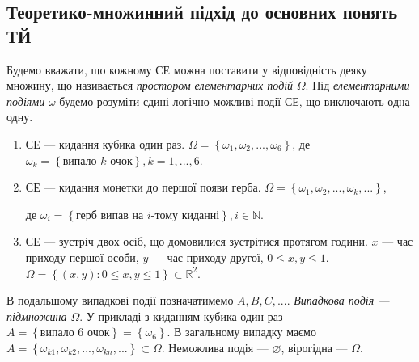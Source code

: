 \subsection{Теоретико-множинний підхід до основних понять ТЙ}
Будемо вважати, що кожному СЕ можна поставити у відповідність деяку множину, що
називається \emph{простором елементарних подій} $\Omega$. 
Під \emph{елементарними подіями} $\omega$ будемо розуміти єдині
логічно можливі події СЕ, що виключають одна одну.
\begin{example}
    \begin{enumerate}
        \mbox{}
        \item СЕ --- кидання кубика один раз. 
        $\Omega = \left\{\omega_1, \omega_2, ..., \omega_6\right\}$, 
        де $\omega_k = \left\{\text{випало } k \text{ очок}\right\}, k = 1,...,6$.
        \item СЕ --- кидання монетки до першої появи герба.
        $\Omega = \left\{\omega_1, \omega_2, ..., \omega_k, ...\right\}$, 
        
        де $\omega_i = \left\{\text{герб випав на }i\text{-тому киданні}\right\}, i\in \mathbb{N}$.
        \item СЕ --- зустріч двох осіб, що домовилися зустрітися протягом години.
        $x$ --- час приходу першої особи, $y$ --- час приходу другої, $0\leq x, y \leq 1$.
        $\Omega = \left\{ \left( x, y\right): 0\leq x, y \leq 1\right\}\subset \mathbb{R}^2$.
    \end{enumerate}
\end{example}
В подальшому випадкові події позначатимемо $A, B, C, ...$. 
\emph{Випадкова подія --- підмножина $\Omega$}. 
У прикладі з киданням кубика один раз $A = \left\{\text{випало }6\text{ очок}\right\} = \left\{ \omega_6\right\}$.
В загальному випадку маємо $A = \left\{\omega_{k1}, \omega_{k2}, ..., \omega_{kn}, ...\right\} \subset \Omega$.
Неможлива подія --- $\varnothing$, вірогідна --- $\Omega$. 

